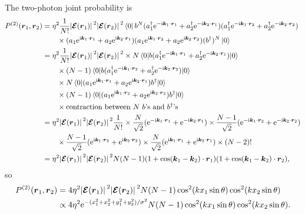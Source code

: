 \documentclass[hyperref, a4paper]{article}
\newcommand*{\ii}{\mathrm{i}}
\newcommand*{\ee}{\mathrm{e}}
\begin{document}
\begin{itemize}
The two-photon joint probability is 
\[
    \begin{aligned}
        P^{(2)}(\vb*{r}_1, \vb*{r}_2) &= \eta^2 \frac{1}{N!} \abs*{\vb*{\mathcal{E}}(\vb*{r}_1)}^2 \abs*{\vb*{\mathcal{E}}(\vb*{r}_2)}^2 \bra*{0} b^N 
        (a_1^\dagger \ee^{- \ii \vb*{k}_1 \cdot \vb*{r}_1} + a_2^\dagger \ee^{- \ii \vb*{k}_2 \cdot \vb*{r}_1}) 
        (a_1^\dagger \ee^{- \ii \vb*{k}_1 \cdot \vb*{r}_2} + a_2^\dagger \ee^{- \ii \vb*{k}_2 \cdot \vb*{r}_2}) \\
        &\quad \quad \times (a_1 \ee^{\ii \vb*{k}_1 \cdot \vb*{r}_1} + a_2 \ee^{\ii \vb*{k}_2 \cdot \vb*{r}_1}) 
        (a_1 \ee^{\ii \vb*{k}_1 \cdot \vb*{r}_2} + a_2 \ee^{ \ii \vb*{k}_2 \cdot \vb*{r}_2}) (b^\dagger)^N \ket*{0} \\
        &= \eta^2 \frac{1}{N!} \abs*{\vb*{\mathcal{E}}(\vb*{r}_1)}^2 \abs*{\vb*{\mathcal{E}}(\vb*{r}_2)}^2 \times N \expval*{b (a_1^\dagger \ee^{- \ii \vb*{k}_1 \cdot \vb*{r}_1} + a_2^\dagger \ee^{- \ii \vb*{k}_2 \cdot \vb*{r}_1})}{0} \\
        &\quad \quad \times (N-1) \expval*{b (a_1^\dagger \ee^{- \ii \vb*{k}_1 \cdot \vb*{r}_2} + a_2^\dagger \ee^{- \ii \vb*{k}_2 \cdot \vb*{r}_2})}{0} \\
        &\quad \quad \times N \expval*{(a_1 \ee^{\ii \vb*{k}_1 \cdot \vb*{r}_1} + a_2 \ee^{ \ii \vb*{k}_2 \cdot \vb*{r}_1}) b^\dagger}{0} \\
        &\quad \quad \times (N-1) \expval*{(a_1 \ee^{\ii \vb*{k}_1 \cdot \vb*{r}_2} + a_2 \ee^{ \ii \vb*{k}_2 \cdot \vb*{r}_2}) b^\dagger}{0} \\
        &\quad \quad \times \text{contraction between $N$ $b$'s and $b^\dagger$'s} \\
        &= \eta^2 \abs*{\vb*{\mathcal{E}}(\vb*{r}_1)}^2 \abs*{\vb*{\mathcal{E}}(\vb*{r}_2)}^2 \frac{1}{N!} \times \frac{N}{\sqrt{2}} (\ee^{-\ii \vb*{k}_1 \cdot \vb*{r}_1} + \ee^{- \ii \vb*{k}_2 \cdot \vb*{r}_1}) \times \frac{N-1}{\sqrt{2}} (\ee^{-\ii \vb*{k}_1 \cdot \vb*{r}_2} + \ee^{- \ii \vb*{k}_2 \cdot \vb*{r}_2}) \\
        &\quad \quad \times \frac{N-1}{\sqrt{2}} (\ee^{\ii \vb*{k}_1 \cdot \vb*{r}_2} + \ee^{ \ii \vb*{k}_2 \cdot \vb*{r}_2}) \times \frac{N}{\sqrt{2}} (\ee^{\ii \vb*{k}_1 \cdot \vb*{r}_1} + \ee^{ \ii \vb*{k}_2 \cdot \vb*{r}_1}) \times (N-2)! \\
        &= \eta^2 \abs*{\vb*{\mathcal{E}}(\vb*{r}_1)}^2 \abs*{\vb*{\mathcal{E}}(\vb*{r}_2)}^2 N (N-1) (1 + \cos (\vb*{k}_1 - \vb*{k}_2) \cdot \vb*{r}_1) (1 + \cos (\vb*{k}_1 - \vb*{k}_2) \cdot \vb*{r}_2),
    \end{aligned}
\]
so 
\begin{equation}
    \begin{aligned}
        P^{(2)}(\vb*{r}_1, \vb*{r}_2) &= 4 \eta^2 \abs*{\vb*{\mathcal{E}}(\vb*{r}_1)}^2 \abs*{\vb*{\mathcal{E}}(\vb*{r}_2)}^2 N (N-1) \cos^2(k x_1 \sin \theta)  \cos^2(k x_2 \sin \theta) \\
        &\propto 4 \eta^2 \ee^{- (x_1^2 + x_2^2 + y_1^2 + y_2^2) / \sigma^2} N (N-1) \cos^2(k x_1 \sin \theta)  \cos^2(k x_2 \sin \theta) .
    \end{aligned}
\end{equation}


\end{itemize}
\end{document}
